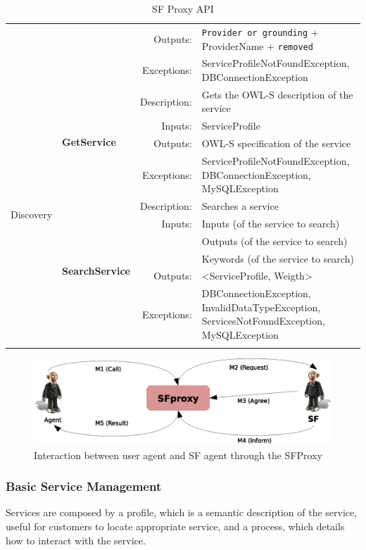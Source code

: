 \begin{longtable}{|p{0.5cm}||p{3cm}|r|p{8cm}|}
    &  & Outputs: & \texttt{Provider or grounding} + ProviderName + \texttt{removed} \\ \cline{3-4}
    &  & Exceptions: & ServiceProfileNotFoundException, DBConnectionException \\ \hline
  \hline
  \multirow{10}{*}{\begin{turn}{90}Discovery\end{turn}} & \multirow{4}{*}{\textbf{GetService}} & Description: & Gets the OWL-S description of the service \\ \cline{3-4}
    &  & Inputs: & ServiceProfile \\ \cline{3-4}
    &  & Outputs: & OWL-S specification of the service \\ \cline{3-4}
    &  & Exceptions: & ServiceProfileNotFoundException, DBConnectionException, MySQLException \\ \cline{2-4} \cline{2-4}
    & \multirow{6}{*}{\textbf{SearchService}} & Description: & Searches a service \\ \cline{3-4}
    &  & Inputs: & Inputs (of the service to search) \\ \cline{4-4}
    &  &  & Outputs (of the service to search) \\ \cline{4-4}
    &  &  & Keywords (of the service to search) \\ \cline{3-4}
    &  & Outputs: & \textless ServiceProfile, Weigth\textgreater \\ \cline{3-4}
    &  & Exceptions: & DBConnectionException, InvalidDataTypeException, ServicesNotFoundException, MySQLException \\ \hline
\caption{SF Proxy API}
\label{tab:thomas_sf_services}
\end{longtable}



\begin{figure}[h!t]
	\centering
	\includegraphics[width=1.0\textwidth]{Thomas/images/sf_sfProxy_interaction}
	\caption{Interaction between user agent and SF agent through the SFProxy}
\end{figure}


\subsubsection{Basic Service Management}
Services are composed by a profile, which is a semantic description of the  service, useful for customers to locate appropriate service, and a process, which details how to interact with the service.

